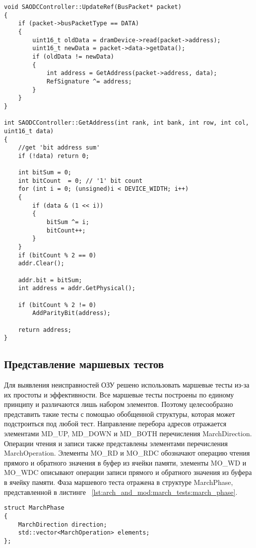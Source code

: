 \begin{lstlisting}[style=cplusplusstyle, caption={Обновление эталонной сигнатуры ОЗУ}, label=lst:arch_and_mod:memory_refresh:update_sig]
void SAODCController::UpdateRef(BusPacket* packet)
{
    if (packet->busPacketType == DATA)
    {
        uint16_t oldData = dramDevice->read(packet->address);
        uint16_t newData = packet->data->getData();
        if (oldData != newData)
        {
            int address = GetAddress(packet->address, data);
            RefSignature ^= address;       
        }
    }
}

int SAODCController::GetAddress(int rank, int bank, int row, int col, uint16_t data)
{
    //get 'bit address sum'
    if (!data) return 0;
    
    int bitSum = 0;
    int bitCount  = 0; // '1' bit count
    for (int i = 0; (unsigned)i < DEVICE_WIDTH; i++)
    {
        if (data & (1 << i))
        {
            bitSum ^= i;
            bitCount++;
        }
    }
    if (bitCount % 2 == 0)
    addr.Clear();
    
    addr.bit = bitSum;
    int address = addr.GetPhysical();

    if (bitCount % 2 != 0)
        AddParityBit(address);
  
    return address;
}
\end{lstlisting} 

\subsection{Представление маршевых тестов}
\label{sub:arch_and_mod:march_tests}
Для выявления неисправностей ОЗУ решено использовать маршевые тесты из-за их простоты и эффективности. Все маршевые тесты построены по единому принципу и различаются лишь набором элементов. Поэтому целесообразно представить такие тесты с помощью обобщенной структуры, которая может подстроиться под любой тест. Направление перебора адресов отражается элементами MD\_UP, MD\_DOWN и MD\_BOTH перечисления MarchDirection. Операции чтения и записи также представлены элементами перечисления MarchOperation. Элементы MO\_RD и MO\_RDC обозначают операцию чтения прямого и обратного значения в буфер из ячейки памяти, элементы MO\_WD и MO\_WDC описывают операции записи прямого и обратного значения из буфера в ячейку памяти. Фаза маршевого теста отражена в структуре MarchPhase, представленной в листинге ~\ref{lst:arch_and_mod:march_tests:march_phase}.

\begin{lstlisting}[style=cplusplusstyle, caption={Структура фазы маршевого теста}, label=lst:arch_and_mod:march_tests:march_phase]
struct MarchPhase
{
    MarchDirection direction;
    std::vector<MarchOperation> elements;
};
\end{lstlisting} 

